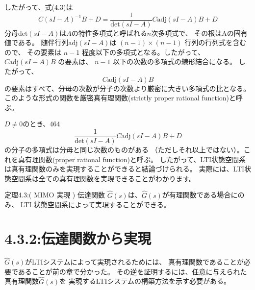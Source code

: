 \documentclass{jsarticle}
\begin{document}
したがって、式(4.3)は
\begin{equation}
  C(sI-A)^{-1}B+D = \frac{1}{\text{det}(sI-A)}C\text{adj}(sI-A)B+D
\end{equation}
分母$\text{det}(sI-A)$は$A$の特性多項式と呼ばれる$n$次多項式で、
その根はAの固有値である。
随伴行列$\text{adj}(sI-A)$は $( n - 1 ) \times ( n - 1 )$ 行列の行列式を含むので、
その要素は $n - 1$ 程度以下の多項式となる。したがって、$C\text{adj}(sI-A)B$ の要素は、
$n - 1$ 以下の次数の多項式の線形結合になる。
したがって、
\begin{equation}
  C\text{adj}(sI-A)B
\end{equation}
の要素はすべて、分母の次数が分子の次数より厳密に大きい多項式の比となる。
このような形式の関数を厳密真有理関数(strictly proper rational function)と呼ぶ。

$D \neq 0$のとき、464
\begin{equation}
  \frac{1}{\text{det}(sI-A)}C\text{adj}(sI-A)B+D
\end{equation}
の分子の多項式は分母と同じ次数のものがある
（ただしそれ以上ではない）。これを真有理関数(proper rational function)と呼ぶ。
したがって、LTI状態空間系は真有理関数のみを実現することができると結論づけられる。
実際には、LTI状態空間系は全ての真有理関数を実現できることがわかります。
\begin{itembox}[l]{定理4.3:( MIMO 実現 )}
  伝達関数 $\hat{G} ( s )$は、$\hat{G} ( s )$が有理関数である場合にのみ、
  LTI 状態空間系によって実現することができる。
\end{itembox}

\section*{4.3.2:伝達関数から実現}
$\hat{G} ( s )$がLTIシステムによって実現されるためには、
真有理関数であることが必要であることが前の章で分かった。
その逆を証明するには、任意に与えられた真有理関数$\hat{G} ( s )$を
実現するLTIシステムの構築方法を示す必要がある。
\end{document}
